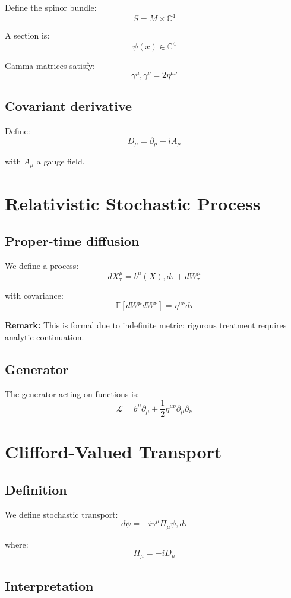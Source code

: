 \documentclass[11pt]{article}
\begin{document}
Define the spinor bundle:
\[
S = M \times \mathbb{C}^4
\]

A section is:
\[
\psi(x) \in \mathbb{C}^4
\]

Gamma matrices satisfy:
\[
{\gamma^\mu,\gamma^\nu} = 2\eta^{\mu\nu}
\]

\subsection{Covariant derivative}

Define:
\[
D_\mu = \partial_\mu - i A_\mu
\]

with $A_\mu$ a gauge field.

\section{Relativistic Stochastic Process}

\subsection{Proper-time diffusion}

We define a process:
\[
dX^\mu_\tau = b^\mu(X), d\tau + dW^\mu_\tau
\]

with covariance:
\[
\mathbb{E}[dW^\mu dW^\nu] = \eta^{\mu\nu} d\tau
\]

\textbf{Remark:} This is formal due to indefinite metric; 
rigorous treatment requires analytic continuation.

\subsection{Generator}

The generator acting on functions is:
\[
\mathcal{L} = b^\mu \partial_\mu + \frac{1}{2} \eta^{\mu\nu} \partial_\mu \partial_\nu
\]

\section{Clifford-Valued Transport}

\subsection{Definition}

We define stochastic transport:
\[
d\psi = -i \gamma^\mu \Pi_\mu \psi , d\tau
\]

where:
\[
\Pi_\mu = -i D_\mu
\]

\subsection{Interpretation}
\end{document}
